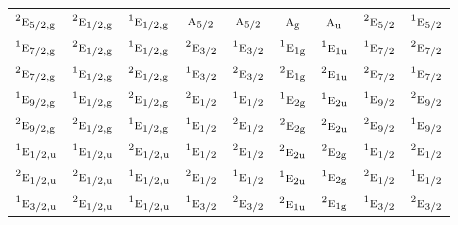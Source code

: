 \documentclass[10pt,a4paper]{article}
\numberwithin{equation}{section}
\newcommand{\irr}[1]{\text{\normalfont\scshape #1}}
\newcommand{\conjpair}[1]{{}^{#1}}
\newcommand{\ptag}[1]{\mathrm{#1}}
\begin{document}
{\begin{longtable}{@{}lcccccccc@{}}
$\conjpair{2}\irr{e}_{5/2,\ptag{g}}$ & $\conjpair{2}\irr{e}_{1/2,\ptag{g}}$ & $\conjpair{1}\irr{e}_{1/2,\ptag{g}}$ & $\irr{a}_{5/2}$ & $\irr{a}_{5/2}$ & $\irr{a}_{\ptag{g}}$ & $\irr{a}_{\ptag{u}}$ & $\conjpair{2}\irr{e}_{5/2}$ & $\conjpair{1}\irr{e}_{5/2}$\\
$\conjpair{1}\irr{e}_{7/2,\ptag{g}}$ & $\conjpair{2}\irr{e}_{1/2,\ptag{g}}$ & $\conjpair{1}\irr{e}_{1/2,\ptag{g}}$ & $\conjpair{2}\irr{e}_{3/2}$ & $\conjpair{1}\irr{e}_{3/2}$ & $\conjpair{1}\irr{e}_{1\ptag{g}}$ & $\conjpair{1}\irr{e}_{1\ptag{u}}$ & $\conjpair{1}\irr{e}_{7/2}$ & $\conjpair{2}\irr{e}_{7/2}$\\
$\conjpair{2}\irr{e}_{7/2,\ptag{g}}$ & $\conjpair{1}\irr{e}_{1/2,\ptag{g}}$ & $\conjpair{2}\irr{e}_{1/2,\ptag{g}}$ & $\conjpair{1}\irr{e}_{3/2}$ & $\conjpair{2}\irr{e}_{3/2}$ & $\conjpair{2}\irr{e}_{1\ptag{g}}$ & $\conjpair{2}\irr{e}_{1\ptag{u}}$ & $\conjpair{2}\irr{e}_{7/2}$ & $\conjpair{1}\irr{e}_{7/2}$\\
$\conjpair{1}\irr{e}_{9/2,\ptag{g}}$ & $\conjpair{1}\irr{e}_{1/2,\ptag{g}}$ & $\conjpair{2}\irr{e}_{1/2,\ptag{g}}$ & $\conjpair{2}\irr{e}_{1/2}$ & $\conjpair{1}\irr{e}_{1/2}$ & $\conjpair{1}\irr{e}_{2\ptag{g}}$ & $\conjpair{1}\irr{e}_{2\ptag{u}}$ & $\conjpair{1}\irr{e}_{9/2}$ & $\conjpair{2}\irr{e}_{9/2}$\\
$\conjpair{2}\irr{e}_{9/2,\ptag{g}}$ & $\conjpair{2}\irr{e}_{1/2,\ptag{g}}$ & $\conjpair{1}\irr{e}_{1/2,\ptag{g}}$ & $\conjpair{1}\irr{e}_{1/2}$ & $\conjpair{2}\irr{e}_{1/2}$ & $\conjpair{2}\irr{e}_{2\ptag{g}}$ & $\conjpair{2}\irr{e}_{2\ptag{u}}$ & $\conjpair{2}\irr{e}_{9/2}$ & $\conjpair{1}\irr{e}_{9/2}$\\
$\conjpair{1}\irr{e}_{1/2,\ptag{u}}$ & $\conjpair{1}\irr{e}_{1/2,\ptag{u}}$ & $\conjpair{2}\irr{e}_{1/2,\ptag{u}}$ & $\conjpair{1}\irr{e}_{1/2}$ & $\conjpair{2}\irr{e}_{1/2}$ & $\conjpair{2}\irr{e}_{2\ptag{u}}$ & $\conjpair{2}\irr{e}_{2\ptag{g}}$ & $\conjpair{1}\irr{e}_{1/2}$ & $\conjpair{2}\irr{e}_{1/2}$\\
$\conjpair{2}\irr{e}_{1/2,\ptag{u}}$ & $\conjpair{2}\irr{e}_{1/2,\ptag{u}}$ & $\conjpair{1}\irr{e}_{1/2,\ptag{u}}$ & $\conjpair{2}\irr{e}_{1/2}$ & $\conjpair{1}\irr{e}_{1/2}$ & $\conjpair{1}\irr{e}_{2\ptag{u}}$ & $\conjpair{1}\irr{e}_{2\ptag{g}}$ & $\conjpair{2}\irr{e}_{1/2}$ & $\conjpair{1}\irr{e}_{1/2}$\\
$\conjpair{1}\irr{e}_{3/2,\ptag{u}}$ & $\conjpair{2}\irr{e}_{1/2,\ptag{u}}$ & $\conjpair{1}\irr{e}_{1/2,\ptag{u}}$ & $\conjpair{1}\irr{e}_{3/2}$ & $\conjpair{2}\irr{e}_{3/2}$ & $\conjpair{2}\irr{e}_{1\ptag{u}}$ & $\conjpair{2}\irr{e}_{1\ptag{g}}$ & $\conjpair{1}\irr{e}_{3/2}$ & $\conjpair{2}\irr{e}_{3/2}$\\

\end{longtable}}
\end{document}

